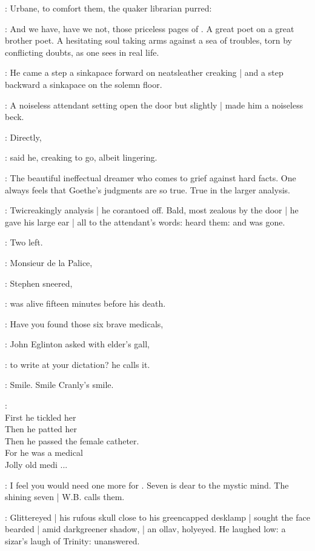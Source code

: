 :
Urbane, to comfort them,
the quaker librarian purred:

\librarian:
And we have, have we not, those priceless pages of .
A great poet on a great brother poet.
A hesitating soul taking arms against a sea of troubles,
torn by conflicting doubts,
as one sees in real life.

:
He came a step a sinkapace forward
on neatsleather creaking |
and a step backward a sinkapace
on the solemn floor.

:
A noiseless attendant setting open the door but slightly |
made him a noiseless beck.

\librarian:
Directly,

:
said he,
creaking to go, albeit lingering.

\librarian:
The beautiful ineffectual dreamer who comes to grief against hard facts.
One always feels that Goethe's judgments are so true.
True in the larger analysis.

:
Twicreakingly analysis |
he corantoed off.
Bald, most zealous by the door |
he gave his large ear |
all to the attendant's words:
heard them:
and was gone.

\StephenInt:
Two left.

\Stephen:
Monsieur de la Palice,

:
Stephen sneered,

\Stephen:
was alive fifteen minutes before his death.

\eglinton:
Have you found those six brave medicals,

:
John Eglinton asked with elder's gall,

\eglinton:
to write  at your dictation?
he calls it.

\StephenInt:
Smile. Smile Cranly's smile.

\StephenInt: \\
    First he tickled her \\
    Then he patted her \\
    Then he passed the female catheter. \\
    For he was a medical \\
    Jolly old medi ...

\eglinton:
I feel you would need one more for .
Seven is dear to the mystic mind.
The shining seven |
W.B. calls them.

:
Glittereyed |
his rufous skull close to his greencapped desklamp |
sought the face bearded |
amid darkgreener shadow, |
an ollav, holyeyed.
He laughed low:
a sizar's laugh of Trinity:
unanswered.


